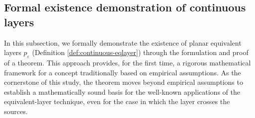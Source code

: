 \subsection{Formal existence demonstration of continuous layers}

In this subsection, we formally demonstrate the existence of planar equivalent layers 
$p_{\varepsilon}$ (Definition \ref{def:continuous-eqlayer}) 
through the formulation and proof of a theorem. This approach provides, for the first time, a rigorous mathematical 
framework for a concept traditionally based on empirical assumptions.
As the cornerstone of this study, the theorem moves beyond empirical assumptions to establish 
a mathematically sound basis for the well-known applications of the equivalent-layer technique, 
even for the case in which the layer crosses the sources.

